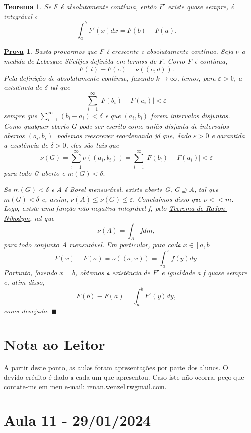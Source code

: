 \documentclass{article}
\newtheorem*{theorem*}{\underline{Teorema}}
\newtheorem*{proof*}{\underline{Prova}}
\renewcommand\qedsymbol{$\blacksquare$}
\begin{document}
\begin{theorem*}
  Se F é absolutamente contínua, então \(F'\) existe quase sempre, é integrável e 
    \[
      \int_{a}^{b}F'(x)dx = F(b) - F(a).
    \]
\end{theorem*}
 \begin{proof*}
   Basta provarmos que F é crescente e absolutamente contínua. Seja \(\nu \) a medida de Lebesgue-Stieltjes definida em termos de F. Como F é contínua,
     \[
       F(d) - F(c) = \nu ((c, d)).
     \]
    Pela definição de absolutamente contínua, fazendo \(k\to \infty\), temos, para \(\varepsilon > 0\), a existência de \(\delta \) tal que 
      \[
        \sum\limits_{i=1}^{\infty}|F(b_{i}) - F(a_{i})| < \varepsilon 
      \]
    sempre que \(\sum\limits_{i=1}^{\infty}(b_{i}-a_{i})<\delta \) e que \((a_{i}, b_{i})\) forem intervalos disjuntos. Como qualquer aberto G pode ser escrito como união disjunta de intervalos abertos \((a_{i}, b_{i})\), podemos reescrever reordenando já que, 
  dado \(\varepsilon > 0\) e garantida a existência de \(\delta > 0\), eles são tais que 
    \[
      \nu (G) = \sum\limits_{i=1}^{\infty}\nu ((a_{i}, b_{i})) = \sum\limits_{i=1}^{\infty}|F(b_{i}) - F(a_{i})| < \varepsilon 
    \]
  para todo G aberto e \(m(G) < \delta .\)

  Se \(m(G) < \delta \) e A é Borel mensurável, existe aberto G, \(G\supseteq A\), tal que \(m(G) < \delta \) e, assim, \(\nu (A) \leq \nu (G) \leq \varepsilon .\) Concluímos disso que \(\nu << m.\) 
Logo, existe uma função não-negativa integrável f, pelo \hyperlink{radon_nikodym}{\textit{Teorema de Radon-Nikodym}}, tal que 
  \[
    \nu (A) = \int_{A}f dm,
  \]
  para todo conjunto A mensurável. Em particular, para cada \(x\in [a, b]\), 
    \[
      F(x) - F(a) = \nu ((a, x)) = \int_{a}^{x}f(y)dy.
    \]
    Portanto, fazendo \(x=b\), obtemos a existência de \(F'\) e igualdade a f quase sempre e, além disso, 
      \[
        F(b) - F(a) = \int_{a}^{b}F'(y)dy,
      \]
    como desejado. \qedsymbol
 \end{proof*}
 \newpage 
\section*{Nota ao Leitor}
  A partir deste ponto, as aulas foram apresentações por parte dos alunos. O devido crédito é dado a cada um que apresentou. Caso isto não ocorra, peço que contate-me em meu e-mail: renan.wenzel.rw\@ gmail.com.
\newpage

\section{Aula 11 - 29/01/2024}
\end{document}
